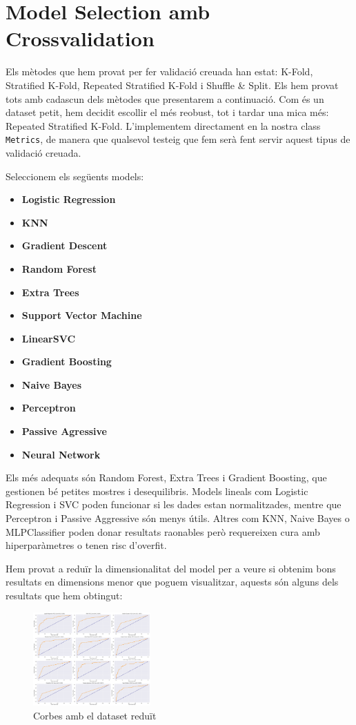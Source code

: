 \documentclass[9pt,a4paper,twoside]{tau-class/tau}
\begin{document}
\section{Model Selection amb Crossvalidation}

Els mètodes que hem provat per fer validació creuada han estat: K-Fold, Stratified K-Fold, Repeated Stratified K-Fold i Shuffle \& Split. Els hem provat tots amb cadascun dels mètodes que presentarem a continuació. Com és un dataset petit, hem decidit escollir el més reobust, tot i tardar una mica més: Repeated Stratified K-Fold. L'implementem directament en la nostra class \texttt{Metrics}, de manera que qualsevol testeig que fem serà fent servir aquest tipus de validació creuada.

Seleccionem els següents models:
\begin{itemize}
    \item \textbf{Logistic Regression}
    \item \textbf{KNN}
    \item \textbf{Gradient Descent}
    \item \textbf{Random Forest}
    \item \textbf{Extra Trees}
    \item \textbf{Support Vector Machine}
    \item \textbf{LinearSVC}
    \item \textbf{Gradient Boosting}
    \item \textbf{Naive Bayes}
    \item \textbf{Perceptron}
    \item \textbf{Passive Agressive}
    \item \textbf{Neural Network}
\end{itemize}

Els més adequats són Random Forest, Extra Trees i Gradient Boosting, que gestionen bé petites mostres i desequilibris. Models lineals com Logistic Regression i SVC poden funcionar si les dades estan normalitzades, mentre que Perceptron i Passive Aggressive són menys útils. Altres com KNN, Naive Bayes o MLPClassifier poden donar resultats raonables però requereixen cura amb hiperparàmetres o tenen risc d’overfit.

Hem provat a reduïr la dimensionalitat del model per a veure si obtenim bons resultats en dimensions menor que poguem visualitzar, aquests són alguns dels resultats que hem obtingut:

\begin{figure}[H]
    \centering
    \includegraphics[width=0.4\textwidth]{figures/red_dims.png}
    \caption{Corbes amb el dataset reduït}
    \label{fig:exemple}
\end{figure}
\end{document}
